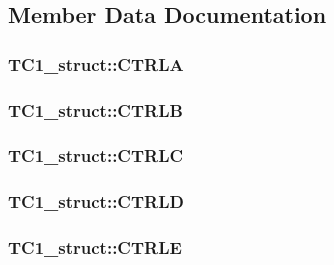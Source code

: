 \subsection{Member Data Documentation}
\hypertarget{struct_t_c1__struct_ac2f10e561e26c40c98bf4731484bfded}{
\subsubsection[{CTRLA}]{ {\bf TC1\_\-struct::CTRLA}}}
\label{struct_t_c1__struct_ac2f10e561e26c40c98bf4731484bfded}
\hypertarget{struct_t_c1__struct_a30f28fb4c295c30960caae8689274409}{
\subsubsection[{CTRLB}]{ {\bf TC1\_\-struct::CTRLB}}}
\label{struct_t_c1__struct_a30f28fb4c295c30960caae8689274409}
\hypertarget{struct_t_c1__struct_a3d51efa1037320ea1397c07aefe40711}{
\subsubsection[{CTRLC}]{ {\bf TC1\_\-struct::CTRLC}}}
\label{struct_t_c1__struct_a3d51efa1037320ea1397c07aefe40711}
\hypertarget{struct_t_c1__struct_a2bbe8de45c4b25cf873bb6c5e7e88b9b}{
\subsubsection[{CTRLD}]{ {\bf TC1\_\-struct::CTRLD}}}
\label{struct_t_c1__struct_a2bbe8de45c4b25cf873bb6c5e7e88b9b}
\hypertarget{struct_t_c1__struct_a5526faa8c07794713dae64eb66fcd272}{
\subsubsection[{CTRLE}]{ {\bf TC1\_\-struct::CTRLE}}}
